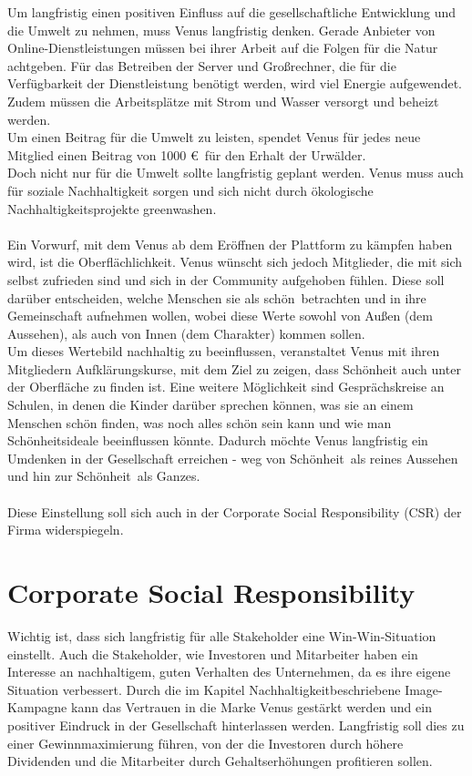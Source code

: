\documentclass[a4paper, fontsize=12pt, parskip=full, toc=bibliographynumbered]{scrreprt}
\begin{document}
Um langfristig einen positiven Einfluss auf die gesellschaftliche Entwicklung und die Umwelt zu nehmen, muss Venus langfristig denken.
Gerade Anbieter von Online-Dienstleistungen müssen bei ihrer Arbeit auf die Folgen für die Natur achtgeben. Für das Betreiben der Server und
Großrechner, die für die Verfügbarkeit der Dienstleistung benötigt werden, wird viel Energie aufgewendet. Zudem müssen die Arbeitsplätze mit Strom 
und Wasser versorgt und beheizt werden.\\
Um einen Beitrag für die Umwelt zu leisten, spendet Venus für jedes neue Mitglied einen Beitrag von 1000 \euro~für den Erhalt der Urwälder. \\
Doch nicht nur für die Umwelt sollte langfristig geplant werden. Venus muss auch für soziale Nachhaltigkeit sorgen und sich nicht durch ökologische Nachhaltigkeitsprojekte \glqq greenwashen\grqq.\\
\\
Ein Vorwurf, mit dem Venus ab dem Eröffnen der Plattform zu kämpfen haben wird, ist die \glqq Oberflächlichkeit\grqq. Venus wünscht sich jedoch Mitglieder, die mit sich selbst zufrieden sind und sich in der Community aufgehoben fühlen. Diese soll darüber entscheiden, welche Menschen sie als \glqq schön\grqq~betrachten und in ihre Gemeinschaft aufnehmen wollen, wobei diese Werte sowohl von Außen (dem Aussehen), als auch von Innen (dem Charakter) kommen sollen.\\
Um dieses Wertebild nachhaltig zu beeinflussen, veranstaltet Venus mit ihren Mitgliedern Aufklärungskurse, mit dem Ziel zu zeigen, dass Schönheit auch unter der Oberfläche zu finden ist. Eine weitere Möglichkeit sind Gesprächskreise an Schulen, in denen die Kinder darüber sprechen können, was sie an einem Menschen schön finden, was noch alles schön sein kann und wie man Schönheitsideale beeinflussen könnte. Dadurch möchte Venus langfristig ein Umdenken in der Gesellschaft erreichen - weg von \glqq Schönheit\grqq~als reines Aussehen und hin zur \glqq Schönheit\grqq~als Ganzes.\\
\\
Diese Einstellung soll sich auch in der Corporate Social Responsibility (CSR) der Firma widerspiegeln.

\author{}
\section{Corporate Social Responsibility}

Wichtig ist, dass sich langfristig für alle Stakeholder eine Win-Win-Situation einstellt. Auch die Stakeholder, wie Investoren und Mitarbeiter haben ein Interesse an nachhaltigem, guten Verhalten des Unternehmen, da es ihre eigene Situation verbessert. Durch die im Kapitel \glqq Nachhaltigkeit\grqq beschriebene Image-Kampagne kann das
Vertrauen in die Marke Venus gestärkt werden und ein positiver Eindruck in der Gesellschaft hinterlassen werden. Langfristig soll dies zu einer Gewinnmaximierung führen, von der die Investoren durch höhere Dividenden und die Mitarbeiter durch Gehaltserhöhungen profitieren sollen.
\end{document}
